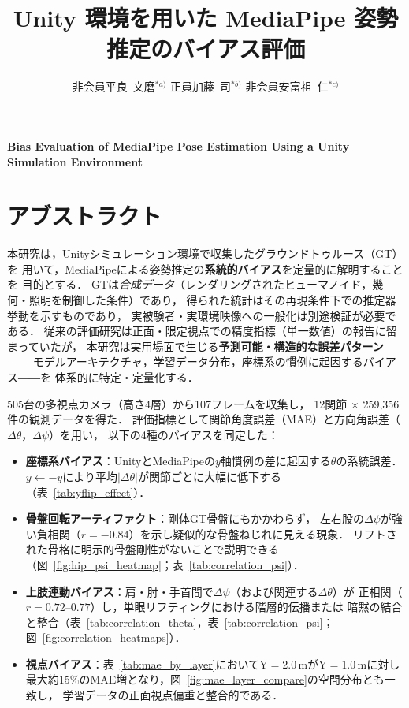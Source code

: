 \documentclass[twocolumn]{article}
\title{Unity 環境を用いた MediaPipe 姿勢推定のバイアス評価}
\author{%
  非会員\quad 平良\ 文磨$^{*a)}$ \qquad
  正員\quad   加藤\ 司$^{*b)}$ \qquad
  非会員\quad 安富祖\ 仁$^{*c)}$\footnotemark[1]
}
\date{}
\begin{document}
\maketitle
\begin{center}\small
\textbf{Bias Evaluation of MediaPipe Pose Estimation Using a Unity Simulation Environment}
\end{center}

\begingroup
\renewcommand{\thefootnote}{}
\endgroup

\section*{アブストラクト}

本研究は，Unityシミュレーション環境で収集したグラウンドトゥルース（GT）を
用いて，MediaPipeによる姿勢推定の\textbf{系統的バイアス}を定量的に解明することを
目的とする．
GTは\emph{合成データ}（レンダリングされたヒューマノイド，幾何・照明を制御した条件）であり，
得られた統計はその再現条件下での推定器挙動を示すものであり，
実被験者・実環境映像への一般化は別途検証が必要である．
従来の評価研究は正面・限定視点での精度指標（単一数値）の報告に留まっていたが，
本研究は実用場面で生じる\textbf{予測可能・構造的な誤差パターン}――
モデルアーキテクチャ，学習データ分布，座標系の慣例に起因するバイアス――を
体系的に特定・定量化する．

505台の多視点カメラ（高さ4層）から107フレームを収集し，
12関節 $\times$ 259,356件の観測データを得た．
評価指標として関節角度誤差（MAE）と方向角誤差（$\Delta\theta$，$\Delta\psi$）を用い，
以下の4種のバイアスを同定した：

\begin{itemize}\itemsep0pt
  \item \textbf{座標系バイアス}：UnityとMediaPipeの$y$軸慣例の差に起因する$\theta$の系統誤差．
        $y \leftarrow -y$により平均$|\Delta\theta|$が関節ごとに大幅に低下する（表~\ref{tab:yflip_effect}）．
  \item \textbf{骨盤回転アーティファクト}：剛体GT骨盤にもかかわらず，
        左右股の$\Delta\psi$が強い負相関（$r=-0.84$）を示し疑似的な骨盤ねじれに見える現象．
        リフトされた骨格に明示的骨盤剛性がないことで説明できる
        （図~\ref{fig:hip_psi_heatmap}；表~\ref{tab:correlation_psi}）．
  \item \textbf{上肢連動バイアス}：肩・肘・手首間で$\Delta\psi$（および関連する$\Delta\theta$）が
        正相関（$r=0.72$--$0.77$）し，単眼リフティングにおける階層的伝播または
        暗黙の結合と整合（表~\ref{tab:correlation_theta}，表~\ref{tab:correlation_psi}；
        図~\ref{fig:correlation_heatmaps}）．
  \item \textbf{視点バイアス}：表~\ref{tab:mae_by_layer}においてY$=$2.0\,mがY$=$1.0\,mに対し
        最大約15\%のMAE増となり，図~\ref{fig:mae_layer_compare}の空間分布とも一致し，
        学習データの正面視点偏重と整合的である．
\end{itemize}
\end{document}
